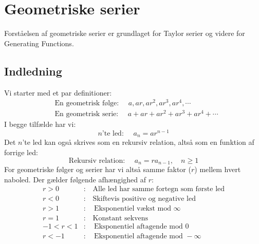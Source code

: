 \section{Geometriske serier}
Forståelsen af geometriske serier er grundlaget for Taylor serier og videre for Generating Functions. 
\subsection{Indledning}
Vi starter med et par definitioner:
\begin{align*}
&\text{En geometrisk følge: } \quad a, ar, ar^{2}, ar^{3}, ar^{4}, \dotsm\\
&\text{En geometrisk serie: } \quad a+ar+ar^{2}+ar^{3}+ar^{4}+ \dotsm
\end{align*}
I begge tilfælde har vi:
\[n\text{'te led: } \quad a_{n}=ar^{n-1}\]
Det \(n\)'te led kan også skrives som en rekursiv relation, altså som en funktion af forrige led:
\[\text{Rekursiv relation: } \quad a_{n}=ra_{n-1}, \quad n \geq 1\]
For geometriske følger og serier har vi altså samme faktor (\(r\)) mellem hvert naboled.
Der gælder følgende afhængighed af \(r\):
\begin{align*}
r>0&: \quad \text{Alle led har samme fortegn som første led}\\
r<0&: \quad \text{Skiftevis positive og negative led}\\
r>1&: \quad \text{Eksponentiel vækst mod } \infty\\
r=1&: \quad \text{Konstant sekvens}\\
-1<r<1&: \quad \text{Eksponentiel aftagende mod } 0\\
r<-1&: \quad \text{Eksponentiel aftagende mod } -\infty
\end{align*}
